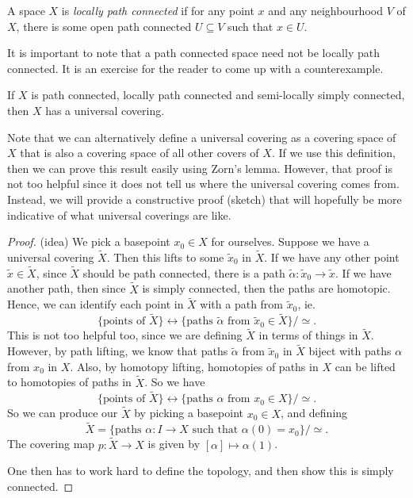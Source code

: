 \documentclass[a4paper]{article}
\begin{document}
\begin{defi}
  A space $X$ is \emph{locally path connected} if for any point $x$ and any neighbourhood $V$ of $X$, there is some open path connected $U \subseteq V$ such that $x \in U$.
\end{defi}

It is important to note that a path connected space need not be locally path connected. It is an exercise for the reader to come up with a counterexample.

\begin{thm}
  If $X$ is path connected, locally path connected and semi-locally simply connected, then $X$ has a universal covering.
\end{thm}
Note that we can alternatively define a universal covering as a covering space of $X$ that is also a covering space of all other covers of $X$. If we use this definition, then we can prove this result easily using Zorn's lemma. However, that proof is not too helpful since it does not tell us where the universal covering comes from. Instead, we will provide a constructive proof (sketch) that will hopefully be more indicative of what universal coverings are like.

\begin{proof}(idea)
  We pick a basepoint $x_0 \in X$ for ourselves. Suppose we have a universal covering $\tilde{X}$. Then this lifts to some $\tilde{x}_0$ in $\tilde{X}$. If we have any other point $\tilde{x} \in \tilde{X}$, since $\tilde{X}$ should be path connected, there is a path $\tilde{\alpha}: \tilde{x}_0 \to \tilde{x}$. If we have another path, then since $\tilde{X}$ is simply connected, then the paths are homotopic. Hence, we can identify each point in $\tilde{X}$ with a path from $\tilde{x}_0$, ie.
  \[
    \{\text{points of }\tilde{X}\} \longleftrightarrow \{\text{paths }\tilde{\alpha}\text{ from }\tilde{x}_0\in \tilde{X}\}/{\simeq}.
  \]
  This is not too helpful too, since we are defining $\tilde{X}$ in terms of things in $\tilde{X}$. However, by path lifting, we know that paths $\tilde{\alpha}$ from $\tilde{x}_0$ in $\tilde{X}$ biject with paths $\alpha$ from $x_0$ in $X$. Also, by homotopy lifting, homotopies of paths in $X$ can be lifted to homotopies of paths in $\tilde{X}$. So we have
  \[
    \{\text{points of }\tilde{X}\} \longleftrightarrow \{\text{paths }\alpha\text{ from }x_0 \in X\}/{\simeq}.
  \]
  So we can produce our $\tilde{X}$ by picking a basepoint $x_0 \in X$, and defining
  \[
    \tilde{X} = \{\text{paths }\alpha: I\to X\text{ such that }\alpha(0) = x_0\}/{\simeq}.
  \]
  The covering map $p: \tilde{X} \to X$ is given by $[\alpha] \mapsto \alpha(1)$.

  One then has to work hard to define the topology, and then show this is simply connected. %
\end{proof}
\end{document}
